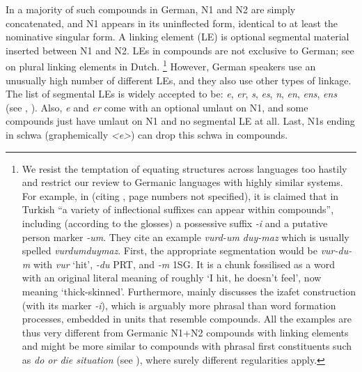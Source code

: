 In a majority of such compounds in German, N1 and N2 are simply concatenated, and N1 appears in its uninflected form, identical to at least the nominative singular form.
A linking element (LE) is optional segmental material inserted between N1 and N2.
LEs in compounds are not exclusive to German; see \textcite{SchreuderEa1998,BangaEa2013a,BangaEa2013b} on plural linking elements in Dutch.%
\footnote{We resist the temptation of equating structures across languages too hastily and restrict our review to Germanic languages with highly similar systems.
For example, in \textcite[4]{KirchnerNicoladis2009} (citing \citealt{Spencer1991}, page numbers not specified), it is claimed that in Turkish ``a variety of inflectional suffixes can appear within compounds'', including (according to the glosses) a possessive suffix \textit{-i} and a putative person marker \mbox{\textit{-um}}.
They cite an example \textit{vurd-um duy-maz} which is usually spelled \textit{vurdumduymaz}.
First, the appropriate segmentation would be \textit{vur-du-m} with \textit{vur} `hit', \textit{-du} PRT, and \textit{-m} \textsc{1SG}.
It is a chunk fossilised as a word with an original literal meaning of roughly `I hit, he doesn't feel', now meaning `thick-skinned'.
Furthermore, \textcite[313--319]{Spencer1991} mainly discusses the izafet construction (with its marker \textit{-i}), which is arguably more phrasal than word formation processes, embedded in units that resemble compounds.
All the examples are thus very different from Germanic N1+N2 compounds with linking elements and might be more similar to compounds with phrasal first constituents such as \textit{do or die situation} (see \citealt[366]{Olsen2015}), where surely different regularities apply.
}
However, German speakers use an unusually high number of different LEs, and they also use other types of linkage.
The list of segmental LEs is widely accepted to be: \textit{e}, \textit{er}, \textit{s}, \textit{es}, \textit{n}, \textit{en}, \textit{ens}, \textit{ens} (see \citealt[31]{Neef2015}, \citealt{KrottEa2007}).
Also, \textit{e} and \textit{er} come with an optional umlaut on N1, and some compounds just have umlaut on N1 and no segmental LE at all.
Last, N1s ending in schwa (graphemically \textit{<e>}) can drop this schwa in compounds.

